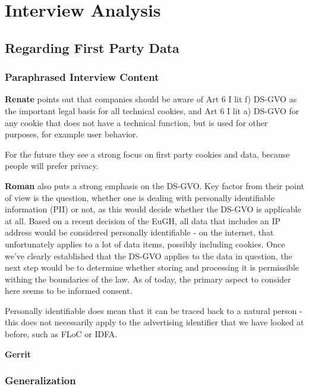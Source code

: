 %
%

\pagebreak
\section{Interview Analysis}

\onehalfspacing

\subsection{Regarding First Party Data}

\subsubsection{Paraphrased Interview Content}

\textbf{Renate} points out that companies should be aware of Art 6 I lit f) DS-GVO as the important legal basis for all technical cookies, and Art 6 I lit a) DS-GVO for any cookie that does not have a technical function, but is used for other purposes, for example user behavior.

For the future they see a strong focus on first party cookies and data, because people will prefer privacy.

\textbf{Roman} also puts a strong emphasis on the DS-GVO. Key factor from their point of view is the question, whether one is dealing with personally identifiable information (PII) or not, as this would decide whether the DS-GVO is applicable at all. Based on a recent decision of the EuGH, all data that includes an IP address would be considered personally identifiable - on the internet, that unfortunately applies to a lot of data items, possibly including cookies. Once we've clearly established that the DS-GVO applies to the data in question, the next step would be to determine whether storing and processing it is permissible withing the boundaries of the law. As of today, the primary aspect to consider here seems to be informed consent.

Personally identifiable does mean that it can be traced back to a natural person - this does not necessarily apply to the advertising identifier that we have looked at before, such as FLoC or IDFA.

\textbf{Gerrit} 

\subsubsection{Generalization}

